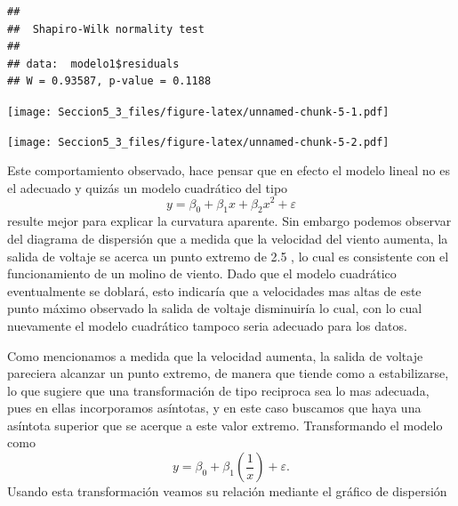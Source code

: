 \documentclass[
]{article}
\newenvironment{Shaded}{\begin{snugshade}}{\end{snugshade}}
\newcommand{\AttributeTok}[1]{\textcolor[rgb]{0.77,0.63,0.00}{#1}}
\newcommand{\DecValTok}[1]{\textcolor[rgb]{0.00,0.00,0.81}{#1}}
\newcommand{\FunctionTok}[1]{\textcolor[rgb]{0.00,0.00,0.00}{#1}}
\newcommand{\NormalTok}[1]{#1}
\newcommand{\SpecialCharTok}[1]{\textcolor[rgb]{0.00,0.00,0.00}{#1}}
\newcommand{\StringTok}[1]{\textcolor[rgb]{0.31,0.60,0.02}{#1}}
\begin{document}
\begin{verbatim}
## 
##  Shapiro-Wilk normality test
## 
## data:  modelo1$residuals
## W = 0.93587, p-value = 0.1188
\end{verbatim}

\begin{Shaded}
\end{Shaded}

\texttt{[image: Seccion5\_3\_files/figure-latex/unnamed-chunk-5-1.pdf]}

\begin{Shaded}
\end{Shaded}

\texttt{[image: Seccion5\_3\_files/figure-latex/unnamed-chunk-5-2.pdf]}

Este comportamiento observado, hace pensar que en efecto el modelo
lineal no es el adecuado y quizás un modelo cuadrático del tipo
\[y=\beta_0+\beta_1 x+\beta_2 x^2+\varepsilon\] resulte mejor para
explicar la curvatura aparente. Sin embargo podemos observar del
diagrama de dispersión que a medida que la velocidad del viento aumenta,
la salida de voltaje se acerca un punto extremo de 2.5 , lo cual es
consistente con el funcionamiento de un molino de viento. Dado que el
modelo cuadrático eventualmente se doblará, esto indicaría que a
velocidades mas altas de este punto máximo observado la salida de
voltaje disminuiría lo cual, con lo cual nuevamente el modelo cuadrático
tampoco seria adecuado para los datos.

Como mencionamos a medida que la velocidad aumenta, la salida de voltaje
pareciera alcanzar un punto extremo, de manera que tiende como a
estabilizarse, lo que sugiere que una transformación de tipo reciproca
sea lo mas adecuada, pues en ellas incorporamos asíntotas, y en este
caso buscamos que haya una asíntota superior que se acerque a este valor
extremo. Transformando el modelo como
\[y=\beta_0+\beta_1 \left(\dfrac{1}{x}\right)+\varepsilon.\] Usando esta
transformación veamos su relación mediante el gráfico de dispersión
\end{document}
